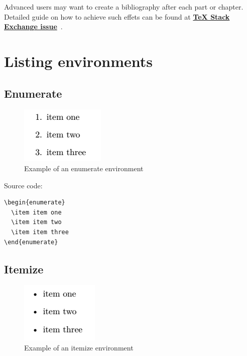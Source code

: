 Advanced users may want to create a bibliography after each part or chapter. Detailed guide on how to achieve such effets can be found at \href{https://tex.stackexchange.com/questions/229846/different-bibliographies-for-each-chapter-with-shared-references}{\textbf{TeX Stack Exchange issue}}~\cite{stack_bibliography_at_each_chapter}.

\section{Listing environments}

\subsection{Enumerate}

\begin{figure}[H]
\centering
\includegraphics[scale=0.8]{content/LaTeX/figures/enumerate_outcome_example.png}
\caption{Example of an enumerate environment}
\label{fig:enumerate_outcome_example}
\end{figure}

Source code:

\begin{Verbatim}
\begin{enumerate}
  \item item one
  \item item two
  \item item three
\end{enumerate} 
\end{Verbatim}

\subsection{Itemize}

\begin{figure}[H]
\centering
\includegraphics[scale=0.8]{content/LaTeX/figures/itemize_outcome_example.png}
\caption{Example of an itemize environment}
\label{fig:itemize_outcome_example}
\end{figure}

